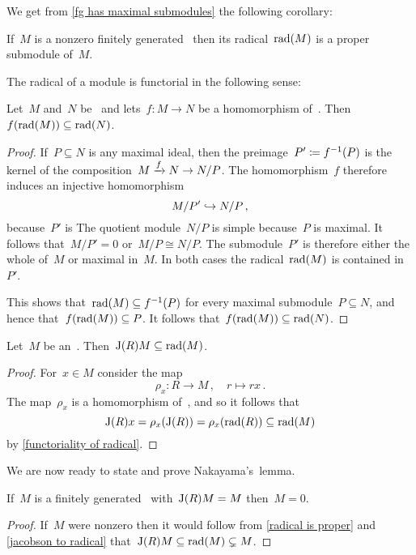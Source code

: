 We get from \cref{fg has maximal submodules} the following corollary:

\begin{corollary}
  \label{radical is proper}
  If~$M$ is a nonzero finitely generated~{} then its radical~$\operatorname{rad}(M)$ is a proper submodule of~$M$.
\end{corollary}

The radical of a module is functorial in the following sense:

\begin{lemma}
  \label{functoriality of radical}
  Let~$M$ and~$N$ be~{} and lets~$f \colon M \to N$ be a homomorphism of~{}.
  Then~$f(\operatorname{rad}(M)) \subseteq \operatorname{rad}(N)$.
\end{lemma}

\begin{proof}
  If~$P \subseteq N$ is any maximal ideal, then the preimage~$P' \coloneqq f^{-1}(P)$ is the kernel of the composition~$M \xrightarrow{f} N \to N/P$.
  The homomorphism~$f$ therefore induces an injective homomorphism
  \[
                M/P'
    \hookrightarrow  N/P \,,
  \]
  because~$P'$ is 
  The quotient module~$N/P$ is simple because~$P$ is maximal.
  It follows that~$M/P' = 0$ or~$M/P \cong N/P$.
  The submodule~$P'$ is therefore either the whole of~$M$ or maximal in~$M$.
  In both cases the radical~$\operatorname{rad}(M)$ is contained in~$P'$.
  
  This shows that~$\operatorname{rad}(M) \subseteq f^{-1}(P)$ for every maximal submodule~$P \subseteq N$, and hence that~$f(\operatorname{rad}(M)) \subseteq P$.
  It follows that~$f(\operatorname{rad}(M)) \subseteq \operatorname{rad}(N)$.
\end{proof}

\begin{corollary}
  \label{jacobson to radical}
  Let~$M$ be an~{}.
  Then~$\operatorname{J}(R) M \subseteq \operatorname{rad}(M)$.
\end{corollary}

\begin{proof}
  For~$x \in M$ consider the map
  \[
            \rho_x
    \colon  R
    \to     M \,,
    \quad   r
    \mapsto rx \,.
  \]
  The map~$\rho_x$ is a homomorphism of~{}, and so it follows that
  \[
              \operatorname{J}(R) x
    =         \rho_x( \operatorname{J}(R) )
    =         \rho_x( \operatorname{rad}(R) )
    \subseteq \operatorname{rad}(M)
  \]
  by \cref{functoriality of radical}.
\end{proof}

We are now ready to state and prove Nakayama’s~lemma.

\begin{lemma}[Nakayama]
  If~$M$ is a finitely generated~{} with~$\operatorname{J}(R) M = M$ then~$M = 0$.
\end{lemma}

\begin{proof}
  If~$M$ were nonzero then it would follow from \cref{radical is proper} and \cref{jacobson to radical} that~$\operatorname{J}(R) M \subseteq \operatorname{rad}(M) \subsetneq M$.
\end{proof}





